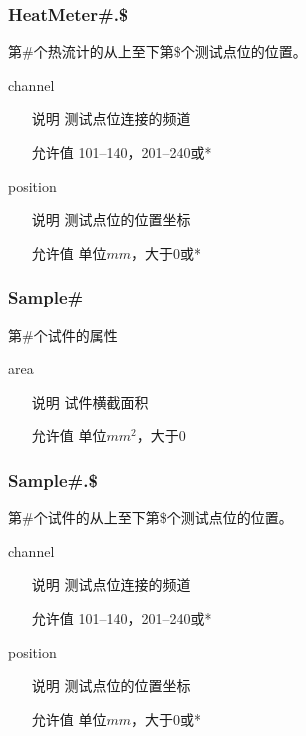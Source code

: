 \subsubsection*{HeatMeter\#.\$}
第\#个热流计的从上至下第\$个测试点位的位置。

\begin{definition}{channel}{}
    \begin{itemize}
        \item[说明] 测试点位连接的频道
        \item[允许值] 101--140，201--240或*
    \end{itemize}
\end{definition}
\begin{definition}{position}{}
    \begin{itemize}
        \item[说明] 测试点位的位置坐标
        \item[允许值] 单位$mm$，大于0或*
    \end{itemize}
\end{definition}

\subsubsection*{Sample\#}
第\#个试件的属性

\begin{definition}{area}{}
    \begin{itemize}
        \item[说明] 试件横截面积
        \item[允许值] 单位$mm^2$，大于0
    \end{itemize}
\end{definition}

\subsubsection*{Sample\#.\$}
第\#个试件的从上至下第\$个测试点位的位置。

\begin{definition}{channel}{}
    \begin{itemize}
        \item[说明] 测试点位连接的频道
        \item[允许值] 101--140，201--240或*
    \end{itemize}
\end{definition}
\begin{definition}{position}{}
    \begin{itemize}
        \item[说明] 测试点位的位置坐标
        \item[允许值] 单位$mm$，大于0或*
    \end{itemize}
\end{definition}


